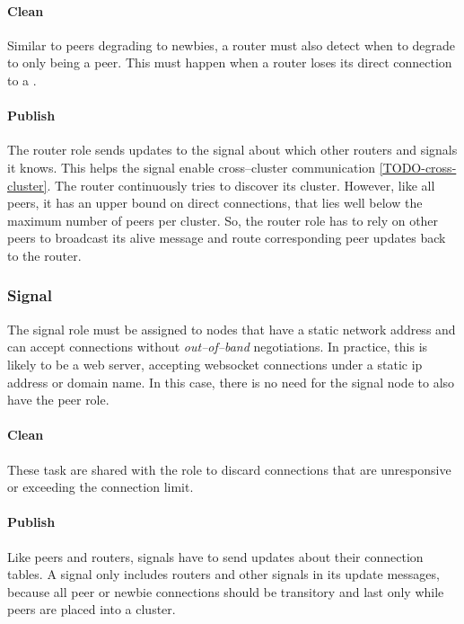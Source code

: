 \paragraph{Clean}
\begin{itemize}
     Similar to peers degrading to newbies, a router must also detect when to degrade to only being a peer. This must happen when a router loses its direct connection to a \signalRole.
\end{itemize}

\paragraph{Publish}
\begin{itemize}
     The router role sends updates to the signal about which other routers and signals it knows. This helps the signal enable cross–cluster communication \ref{TODO-cross-cluster}.
     The router continuously tries to discover its cluster. However, like all peers, it has an upper bound on direct connections, that lies well below the maximum number of peers per cluster. So, the router role has to rely on other peers to broadcast its alive message and route corresponding peer updates back to the router.
\end{itemize}

\subsubsection{Signal}
The signal role must be assigned to nodes that have a static network address and can accept connections without \textit{out–of–band} negotiations. In practice, this is likely to be a web server, accepting \gls{websocket} connections under a static \gls{ip} address or domain name. In this case, there is no need for the signal node to also have the peer role.

\paragraph{Clean}
\begin{itemize}
     These task are shared with the \peerRole role to discard connections that are unresponsive or exceeding the connection limit.
\end{itemize}

\paragraph{Publish}
\begin{itemize}
     Like peers and routers, signals have to send updates about their connection tables. A signal only includes routers and other signals in its update messages, because all peer or newbie connections should be transitory and last only while peers are placed into a cluster.
\end{itemize}
